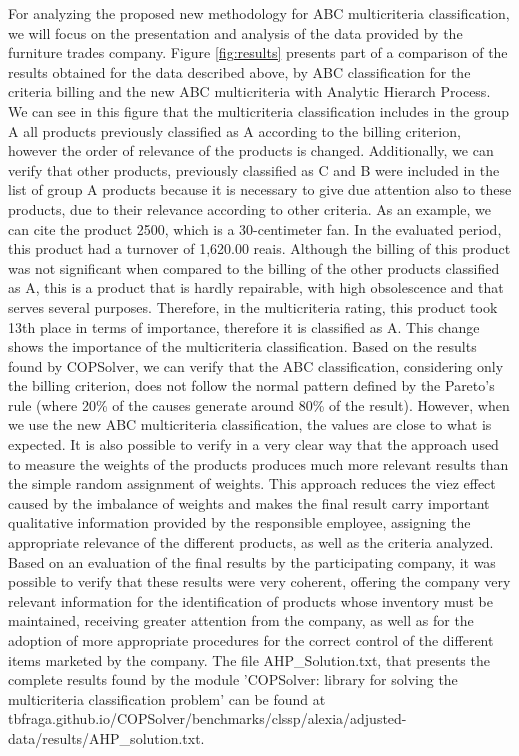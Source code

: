\documentclass[10pt,fleqn,a4paper,twoside]{article}
\begin{document}
For analyzing the proposed new methodology for ABC multicriteria classification, we will focus on the presentation and analysis of the data provided by the furniture trades company. Figure \ref{fig:results} presents part of a comparison of the results obtained for the data described above, by ABC classification for the criteria billing and the new ABC multicriteria with Analytic Hierarch Process. We can see in this figure that the multicriteria classification includes in the group A all products previously classified as A according to the billing criterion, however the order of relevance of the products is changed. Additionally, we can verify that other products, previously classified as C and B were included in the list of group A products because it is necessary to give due attention also to these products, due to their relevance according to other criteria. As an example, we can cite the product 2500, which is a 30-centimeter fan. In the evaluated period, this product had a turnover of 1,620.00 reais. Although the billing of this product was not significant when compared to the billing of the other products classified as A, this is a product that is hardly repairable, with high obsolescence and that serves several purposes. Therefore, in the multicriteria rating, this product took 13th place in terms of importance, therefore it is classified as A. This change shows the importance of the multicriteria classification. Based on the results found by COPSolver, we can verify that the ABC classification, considering only the billing criterion, does not follow the normal pattern defined by the Pareto's rule (where 20\% of the causes generate around 80\% of the result). However, when we use the new ABC multicriteria classification, the values are close to what is expected. It is also possible to verify in a very clear way that the approach used to measure the weights of the products produces much more relevant results than the simple random assignment of weights. This approach reduces the viez effect caused by the imbalance of weights and makes the final result carry important qualitative information provided by the responsible employee, assigning the appropriate relevance of the different products, as well as the criteria analyzed. Based on an evaluation of the final results by the participating company, it was possible to verify that these results were very coherent, offering the company very relevant information for the identification of products whose inventory must be maintained, receiving greater attention from the company, as well as for the adoption of more appropriate procedures for the correct control of the different items marketed by the company. The file AHP\_Solution.txt, that presents the complete results found by the module 'COPSolver: library for solving the multicriteria classification problem' can be found at tbfraga.github.io/COPSolver/benchmarks/clssp/alexia/adjusted-data/results/AHP\_solution.txt. 
\end{document}
